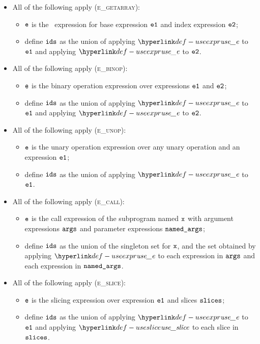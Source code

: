 \begin{itemize}
  \item All of the following apply (\textsc{e\_getarray}):
  \begin{itemize}
    \item $\texttt{e}$ is the \arrayaccess\ expression for base expression $\texttt{e1}$ and index expression $\texttt{e2}$;
    \item define $\texttt{ids}$ as the union of applying $\useexpr$ to $\texttt{e1}$ and applying $\useexpr$ to $\texttt{e2}$.
  \end{itemize}

  \item All of the following apply (\textsc{e\_binop}):
  \begin{itemize}
    \item $\texttt{e}$ is the binary operation expression over expressions $\texttt{e1}$ and $\texttt{e2}$;
    \item define $\texttt{ids}$ as the union of applying $\useexpr$ to $\texttt{e1}$ and applying $\useexpr$ to $\texttt{e2}$.
  \end{itemize}

  \item All of the following apply (\textsc{e\_unop}):
  \begin{itemize}
    \item $\texttt{e}$ is the unary operation expression over any unary operation and an expression $\texttt{e1}$;
    \item define $\texttt{ids}$ as the union of applying $\useexpr$ to $\texttt{e1}$.
  \end{itemize}

  \item All of the following apply (\textsc{e\_call}):
  \begin{itemize}
    \item $\texttt{e}$ is the call expression of the subprogram named $\texttt{x}$ with argument expressions $\texttt{args}$ and parameter expressions $\texttt{named\_args}$;
    \item define $\texttt{ids}$ as the union of the singleton set for $\texttt{x}$, and the set obtained by applying $\useexpr$ to each expression in
          $\texttt{args}$ and each expression in $\texttt{named\_args}$.
  \end{itemize}

  \item All of the following apply (\textsc{e\_slice}):
  \begin{itemize}
    \item $\texttt{e}$ is the slicing expression over expression $\texttt{e1}$ and slices $\texttt{slices}$;
    \item define $\texttt{ids}$ as the union of applying $\useexpr$ to $\texttt{e1}$ and applying $\useslice$ to each slice in $\texttt{slices}$.
  \end{itemize}


\end{itemize}

